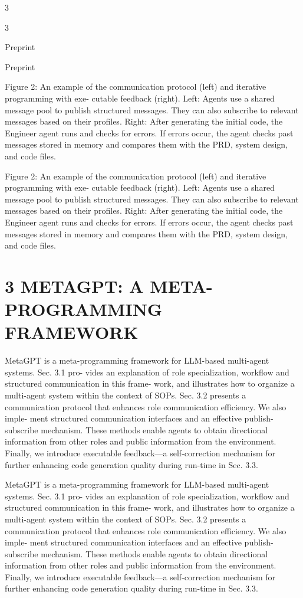 \documentclass[12pt]{article}
\begin{document}
3


3


Preprint


Preprint


Figure 2: An example of the communication protocol (left) and iterative programming with exe-
cutable feedback (right). Left: Agents use a shared message pool to publish structured messages.
They can also subscribe to relevant messages based on their profiles. Right: After generating the
initial code, the Engineer agent runs and checks for errors. If errors occur, the agent checks past
messages stored in memory and compares them with the PRD, system design, and code files.


Figure 2: An example of the communication protocol (left) and iterative programming with exe-
cutable feedback (right). Left: Agents use a shared message pool to publish structured messages.
They can also subscribe to relevant messages based on their profiles. Right: After generating the
initial code, the Engineer agent runs and checks for errors. If errors occur, the agent checks past
messages stored in memory and compares them with the PRD, system design, and code files.


\section{3 METAGPT: A META-PROGRAMMING FRAMEWORK}


MetaGPT is a meta-programming framework for LLM-based multi-agent systems. Sec. 3.1 pro-
vides an explanation of role specialization, workflow and structured communication in this frame-
work, and illustrates how to organize a multi-agent system within the context of SOPs. Sec. 3.2
presents a communication protocol that enhances role communication efficiency. We also imple-
ment structured communication interfaces and an effective publish-subscribe mechanism. These
methods enable agents to obtain directional information from other roles and public information
from the environment. Finally, we introduce executable feedback—a self-correction mechanism for
further enhancing code generation quality during run-time in Sec. 3.3.


MetaGPT is a meta-programming framework for LLM-based multi-agent systems. Sec. 3.1 pro-
vides an explanation of role specialization, workflow and structured communication in this frame-
work, and illustrates how to organize a multi-agent system within the context of SOPs. Sec. 3.2
presents a communication protocol that enhances role communication efficiency. We also imple-
ment structured communication interfaces and an effective publish-subscribe mechanism. These
methods enable agents to obtain directional information from other roles and public information
from the environment. Finally, we introduce executable feedback—a self-correction mechanism for
further enhancing code generation quality during run-time in Sec. 3.3.
\end{document}
